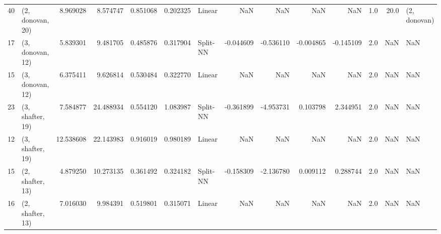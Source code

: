 \begin{tabular}{llrrrrlrrrrrrl}
40 &  (2, donovan, 20) &   8.969028 &   8.574747 &   0.851068 &  0.202325 &      Linear &             NaN &           NaN &            NaN &          NaN &            1.0 &   20.0 &     (2, donovan) \\
17 &  (3, donovan, 12) &   5.839301 &   9.481705 &   0.485876 &  0.317904 &    Split-NN &       -0.044609 &     -0.536110 &      -0.004865 &    -0.145109 &            2.0 &    NaN &              NaN \\
15 &  (3, donovan, 12) &   6.375411 &   9.626814 &   0.530484 &  0.322770 &      Linear &             NaN &           NaN &            NaN &          NaN &            2.0 &    NaN &              NaN \\
23 &  (3, shafter, 19) &   7.584877 &  24.488934 &   0.554120 &  1.083987 &    Split-NN &       -0.361899 &     -4.953731 &       0.103798 &     2.344951 &            2.0 &    NaN &              NaN \\
12 &  (3, shafter, 19) &  12.538608 &  22.143983 &   0.916019 &  0.980189 &      Linear &             NaN &           NaN &            NaN &          NaN &            2.0 &    NaN &              NaN \\
15 &  (2, shafter, 13) &   4.879250 &  10.273135 &   0.361492 &  0.324182 &    Split-NN &       -0.158309 &     -2.136780 &       0.009112 &     0.288744 &            2.0 &    NaN &              NaN \\
16 &  (2, shafter, 13) &   7.016030 &   9.984391 &   0.519801 &  0.315071 &      Linear &             NaN &           NaN &            NaN &          NaN &            2.0 &    NaN &              NaN \\
\bottomrule
\end{tabular}
